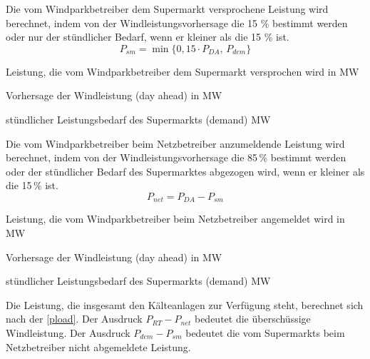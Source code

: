 Die vom Windparkbetreiber dem Supermarkt versprochene Leistung wird berechnet,
indem von der Windleistungsvorhersage die 15 \% bestimmt werden oder nur der
st\"undlicher Bedarf, wenn er kleiner als die 15 \% ist.
\begin{equation*}
	P_{sm} = \min \{ 0,15 \cdot P_{DA},\, P_{dem} \} 
\end{equation*}

\begin{description}[\dth]
	\item[$P_{sm}$] Leistung, die vom Windparkbetreiber dem Supermarkt
	versprochen wird in MW
	\item[$P_{DA}$] Vorhersage der Windleistung (day ahead) in MW
	\item[$P_{dem}$] st\"undlicher Leistungsbedarf des Supermarkts (demand)
	MW
\end{description}
\vspace{0.5cm}

Die vom Windparkbetreiber beim Netzbetreiber anzumeldende Leistung wird
berechnet, indem von der Windleistungsvorhersage die 85\,\% bestimmt werden
oder der st\"undlicher Bedarf des Supermarktes abgezogen wird, wenn er kleiner
als die 15\,\% ist.
\begin{equation*}
	P_{net} = P_{DA} - P_{sm}
\end{equation*}

\begin{description}[\dth]
	\item[$P_{net}$] Leistung, die vom Windparkbetreiber beim Netzbetreiber
	angemeldet wird in MW
	\item[$P_{DA}$] Vorhersage der Windleistung (day ahead) in MW
	\item[$P_{dem}$] st\"undlicher Leistungsbedarf des Supermarkts (demand)
	MW
 \end{description} \vspace{0.5cm}


Die Leistung, die insgesamt den K\"alteanlagen zur Verf\"ugung steht, berechnet
sich nach der \cref{pload}. Der Ausdruck $P_{RT} - P_{net}$ bedeutet die
\"ubersch\"ussige Windleistung. Der Ausdruck $P_{dem} - P_{sm}$  bedeutet die vom
Supermarkts beim Netzbetreiber nicht abgemeldete Leistung.

